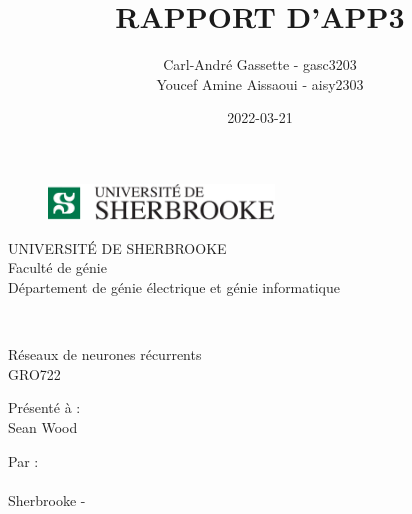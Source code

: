 \documentclass{article}
\author{Carl-André Gassette - gasc3203 \\
Youcef Amine Aissaoui - aisy2303 }
\date{2022-03-21}
\title{RAPPORT D'APP3}
\newcommand{\titreCours}{Réseaux de neurones récurrents}
\newcommand{\numeroAPP}{GRO722}
\newcommand{\nomsProfesseurs}{Sean Wood}
\begin{document}
\makeatletter
\begin{titlepage}
\begin{figure}
    \centering
    \includegraphics[width=60mm]{logoUDES.png}
\end{figure}
	\centering
        \huge{UNIVERSITÉ DE SHERBROOKE}\\
        Faculté de génie\\
        Département de génie électrique et génie informatique\\
        \vspace{1cm}
        
        \textsc{\huge{\@title}}\\
        \vspace{1cm}
        
        {\huge{\titreCours}}\\
        \numeroAPP\\
        \vspace{1cm}
        
        {\large Présenté à :}\\
        \nomsProfesseurs\\
        \vspace{1cm}
        
        {\large Par :}\\
        {\@author}\\
        
	\vfill
        {\large Sherbrooke - \@date}

\end{titlepage}
\makeatother
{}
\tableofcontents
\newpage
\listoffigures
\newpage
{}
\setcounter{page}{1}
\setcounter{equation}{0}








\end{document}
